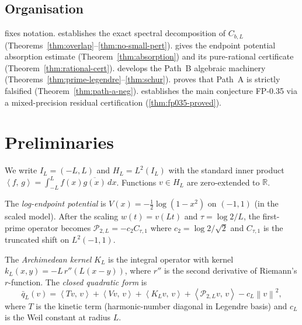 \documentclass[12pt,a4paper]{amsart}
\theoremstyle{plain}
\theoremstyle{definition}
\newcommand{\R}{\mathbb{R}}
\newcommand{\qbar}{\bar{q}}
\newcommand{\Ctau}{C_{\tau,1}}
\newcommand{\ctwo}{c_2}              %
\newcommand{\norm}[1]{\left\|#1\right\|}
\newcommand{\ip}[2]{\left\langle #1,\, #2\right\rangle}
\begin{document}
\subsection{Organisation}

 fixes notation.
 establishes the exact spectral decomposition of $C_{b,L}$
(Theorems~\ref{thm:overlap}--\ref{thm:no-small-pert}).
 gives the endpoint potential absorption estimate
(Theorem~\ref{thm:absorption}) and its pure-rational certificate
(Theorem~\ref{thm:rational-cert}).
 develops the Path~B algebraic machinery
(Theorems~\ref{thm:prime-legendre}--\ref{thm:schur}).
 proves that Path~A is strictly falsified
(Theorem~\ref{thm:path-a-neg}).
 establishes the main conjecture FP-0.35 via
a mixed-precision residual certification (\cref{thm:fp035-proved}).

\section{Preliminaries}
\label{sec:prelim}

We write $I_L = (-L,L)$ and $H_L = L^2(I_L)$ with the standard inner product
$\ip{f}{g} = \int_{-L}^L f(x)\overline{g(x)}\,dx$.
Functions $v \in H_L$ are zero-extended to $\R$.

The \emph{log-endpoint potential} is
$V(x) = -\tfrac{1}{2}\log(1-x^2)$ on $(-1,1)$ (in the scaled model).
After the scaling $w(t) = v(Lt)$ and $\tau = \log 2/L$, the first-prime
operator becomes $\mathcal P_{2,L} = -\ctwo C_{\tau,1}$ where
$\ctwo = \log 2/\sqrt 2$ and $\Ctau$ is the truncated shift on $L^2(-1,1)$.

The \emph{Archimedean kernel} $K_L$ is the integral operator with kernel
$k_L(x,y) = -L\,r''(L(x-y))$, where $r''$ is the second derivative of
Riemann's $r$-function.
The \emph{closed quadratic form} is
\[
  \qbar_L(v) = \ip{Tv}{v} + \ip{Vv}{v} + \ip{K_Lv}{v}
               + \ip{\mathcal P_{2,L}v}{v} - c_L\norm{v}^2,
\]
where $T$ is the kinetic term (harmonic-number diagonal in Legendre basis)
and $c_L$ is the Weil constant at radius $L$.
\end{document}
